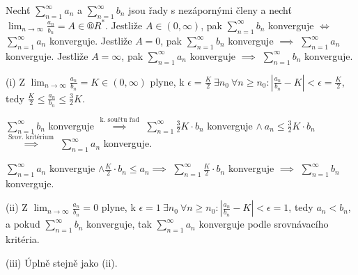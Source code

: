 \documentclass[12pt]{article}                   %
\begin{document}
        \begin{veta}
            Nechť $\sum_{n=1}^∞ a_n$ a $\sum_{n=1}^∞ b_n$ jsou řady s nezápornými členy a nechť $\lim_{n \rightarrow ∞} \frac{a_n}{b_n} = A \in ®R^*$. Jestliže $A \in (0, ∞)$, pak $\sum_{n=1}^∞ b_n$ konverguje $\Leftrightarrow$ $\sum_{n=1}^∞ a_n$ konverguje. Jestliže $A = 0$, pak $\sum_{n=1}^∞ b_n$ konverguje $\implies$ $\sum_{n=1}^∞ a_n$ konverguje. Jestliže $A = ∞$, pak $\sum_{n=1}^∞ a_n$ konverguje $\implies$ $\sum_{n=1}^∞ b_n$ konverguje.

            \begin{dukazin}
                (i) Z $\lim_{n \rightarrow ∞} \frac{a_n}{b_n} = K \in (0, ∞)$ plyne, k $\epsilon = \frac{K}{2}\ \exists n_0\ \forall n ≥ n_0: \left| \frac{a_n}{b_n} - K \right| < \epsilon = \frac{K}{2}$, tedy $\frac{K}{2} ≤ \frac{a_n}{b_n} ≤ \frac{3}{2}K$.

                $\sum_{n=1}^∞ b_n$ konverguje $\overset{\text{k. součtu řad}}{\implies}$ $\sum_{n=1}^∞ \frac{3}{2}K·b_n$ konverguje $\land\ a_n ≤ \frac{3}{2}K·b_n$ $\overset{\text{Srov. kritérium}}{\implies}$ $\sum_{n=1}^∞ a_n$ konverguje.

                $\sum_{n=1}^∞ a_n$ konverguje $\land \frac{K}{2}·b_n ≤ a_n \implies$ $\sum_{n=1}^∞ \frac{K}{2}·b_n$ konverguje $\implies$ $\sum_{n=1}^∞ b_n$ konverguje.

                (ii) Z $\lim_{n \rightarrow ∞} \frac{a_n}{b_n} = 0$ plyne, k $\epsilon = 1\ \exists n_0\ \forall n≥n_0: \left| \frac{a_n}{b_n} - K \right| < \epsilon = 1$, tedy $a_n < b_n$, a pokud $\sum_{n=1}^∞ b_n$ konverguje, tak $\sum_{n=1}^∞ a_n$ konverguje podle srovnávacího kritéria.

                (iii) Úplně stejně jako (ii).
            \end{dukazin}
        \end{veta}

\end{document}
